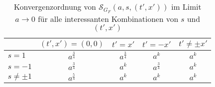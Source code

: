 \begin{table}[]
\centering
\begin{tabular}{l|cccc}
        & \multicolumn{1}{l}{$(t', x') = (0, 0)$} & \multicolumn{1}{l}{$t' = x'$} & \multicolumn{1}{l}{$t' = -x'$} & \multicolumn{1}{l}{$t' \neq \pm x'$} \\ \hline
$s=1$   & $a^{\frac{3}{4}}$                       & $a^{\frac{3}{4}}$             & $a^k$                          & $a^k$                                \\
$s=-1$  &$a^{\frac{3}{4}}$                       & $a^k$                         & $a^{\frac{3}{4}}$              & $a^k$                                \\
$s \neq \pm 1$ & $a^{\frac{5}{4}}$                       & $a^k$                         & $a^k$                          & $a^k$                                \\
\end{tabular}
\caption{Konvergenzordnung von $\mathcal{S}_{G_F}(a,s,(t',x'))$ im Limit $a \to 0$ für alle interessanten Kombinationen von $s$ und $(t',x')$}
\label{tab:wavefrontset_gf}
\end{table}









